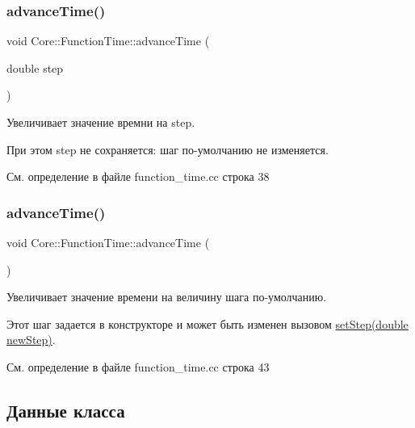 \subsubsection{\texorpdfstring{advance\+Time()}{advanceTime()}\hspace{0.1cm}{\footnotesize\ttfamily [1/2]}}
{\footnotesize\ttfamily void Core\+::\+Function\+Time\+::advance\+Time (\begin{DoxyParamCaption}\item[{double}]{step }\end{DoxyParamCaption})}



Увеличивает значение времни на step. 

При этом step не сохраняется\+: шаг по-\/умолчанию не изменяется. 

См. определение в файле function\+\_\+time.\+cc строка 38

\hypertarget{class_core_1_1_function_time_ab2b13d7c42f8a52c2f4ae58efb88ef73}{}\label{class_core_1_1_function_time_ab2b13d7c42f8a52c2f4ae58efb88ef73} 
\subsubsection{\texorpdfstring{advance\+Time()}{advanceTime()}\hspace{0.1cm}{\footnotesize\ttfamily [2/2]}}
{\footnotesize\ttfamily void Core\+::\+Function\+Time\+::advance\+Time (\begin{DoxyParamCaption}{ }\end{DoxyParamCaption})}



Увеличивает значение времени на величину шага по-\/умолчанию. 

Этот шаг задается в конструкторе и может быть изменен вызовом \hyperlink{class_core_1_1_function_time_ad1a60dab2d7d8a046893751843c13208}{set\+Step(double new\+Step)}. 

См. определение в файле function\+\_\+time.\+cc строка 43



\subsection{Данные класса}
\hypertarget{class_core_1_1_function_time_a31d15f7adb8bdecfd22bd35c8fd6eefe}{}\label{class_core_1_1_function_time_a31d15f7adb8bdecfd22bd35c8fd6eefe} 
